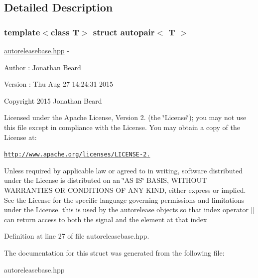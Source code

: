 \subsection{Detailed Description}
\subsubsection*{template$<$class T$>$\newline
struct autopair$<$ T $>$}

\hyperlink{autoreleasebase_8hpp_source}{autoreleasebase.\+hpp} -\/ \begin{DoxyAuthor}{Author}
\+: Jonathan Beard 
\end{DoxyAuthor}
\begin{DoxyVersion}{Version}
\+: Thu Aug 27 14\+:24\+:31 2015
\end{DoxyVersion}
Copyright 2015 Jonathan Beard

Licensed under the Apache License, Version 2. (the \char`\"{}\+License\char`\"{}); you may not use this file except in compliance with the License. You may obtain a copy of the License at\+:

\href{http://www.apache.org/licenses/LICENSE-2.0}{\tt http\+://www.\+apache.\+org/licenses/\+L\+I\+C\+E\+N\+S\+E-\/2.}

Unless required by applicable law or agreed to in writing, software distributed under the License is distributed on an \char`\"{}\+A\+S I\+S\char`\"{} B\+A\+S\+IS, W\+I\+T\+H\+O\+UT W\+A\+R\+R\+A\+N\+T\+I\+ES OR C\+O\+N\+D\+I\+T\+I\+O\+NS OF A\+NY K\+I\+ND, either express or implied. See the License for the specific language governing permissions and limitations under the License. this is used by the autorelease objects so that index operator \mbox{[}\mbox{]} can return access to both the signal and the element at that index 

Definition at line 27 of file autoreleasebase.\+hpp.



The documentation for this struct was generated from the following file\+:\begin{DoxyCompactItemize}
\item 
autoreleasebase.\+hpp\end{DoxyCompactItemize}
